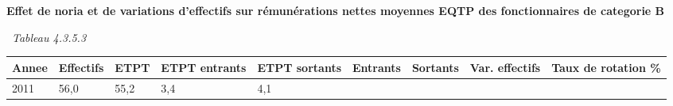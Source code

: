 \textbf{Effet de noria et de variations d'effectifs sur rémunérations
nettes moyennes EQTP des fonctionnaires de categorie B}

~\emph{Tableau 4.3.5.3}

\begin{longtable}[]{@{}lllllllll@{}}
\toprule
\begin{minipage}[b]{0.05\columnwidth}\raggedright
Annee\strut
\end{minipage} & \begin{minipage}[b]{0.08\columnwidth}\raggedright
Effectifs\strut
\end{minipage} & \begin{minipage}[b]{0.04\columnwidth}\raggedright
ETPT\strut
\end{minipage} & \begin{minipage}[b]{0.10\columnwidth}\raggedright
ETPT entrants\strut
\end{minipage} & \begin{minipage}[b]{0.10\columnwidth}\raggedright
ETPT sortants\strut
\end{minipage} & \begin{minipage}[b]{0.07\columnwidth}\raggedright
Entrants\strut
\end{minipage} & \begin{minipage}[b]{0.07\columnwidth}\raggedright
Sortants\strut
\end{minipage} & \begin{minipage}[b]{0.11\columnwidth}\raggedright
Var. effectifs\strut
\end{minipage} & \begin{minipage}[b]{0.14\columnwidth}\raggedright
Taux de rotation \%\strut
\end{minipage}\tabularnewline
\midrule
\endhead
\begin{minipage}[t]{0.05\columnwidth}\raggedright
2011\strut
\end{minipage} & \begin{minipage}[t]{0.08\columnwidth}\raggedright
56,0\strut
\end{minipage} & \begin{minipage}[t]{0.04\columnwidth}\raggedright
55,2\strut
\end{minipage} & \begin{minipage}[t]{0.10\columnwidth}\raggedright
3,4\strut
\end{minipage} & \begin{minipage}[t]{0.10\columnwidth}\raggedright
4,1\strut
\end{minipage} & \begin{minipage}[t]{0.07\columnwidth}\raggedright

\end{minipage}
\end{longtable}
